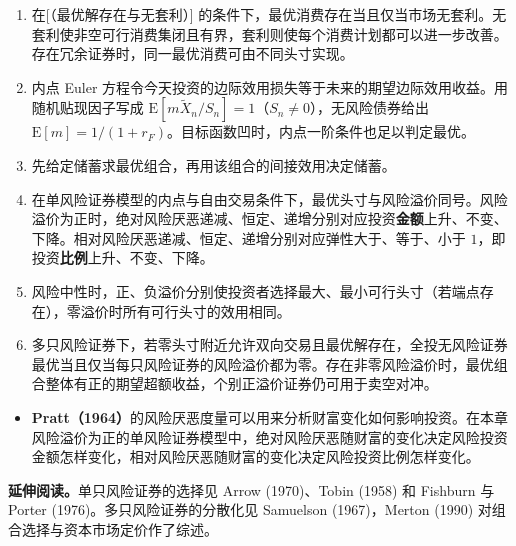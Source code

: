 \WJChapterSummary
\begin{tcolorbox}[summary]
\begin{enumerate}
 \item 在[（最优解存在与无套利）] 的条件下，最优消费存在当且仅当市场无套利。无套利使非空可行消费集闭且有界，套利则使每个消费计划都可以进一步改善。存在冗余证券时，同一最优消费可由不同头寸实现。
 \item 内点 Euler 方程令今天投资的边际效用损失等于未来的期望边际效用收益。用随机贴现因子写成 $\mathrm E[m\widetilde X_n/S_n]=1$（$S_n\ne0$），无风险债券给出 $\mathrm E[m]=1/(1+r_F)$。目标函数凹时，内点一阶条件也足以判定最优。
 \item 先给定储蓄求最优组合，再用该组合的间接效用决定储蓄。
 \item 在单风险证券模型的内点与自由交易条件下，最优头寸与风险溢价同号。风险溢价为正时，绝对风险厌恶递减、恒定、递增分别对应投资\textbf{金额}上升、不变、下降。相对风险厌恶递减、恒定、递增分别对应弹性大于、等于、小于 $1$，即投资\textbf{比例}上升、不变、下降。
 \item 风险中性时，正、负溢价分别使投资者选择最大、最小可行头寸（若端点存在），零溢价时所有可行头寸的效用相同。
 \item 多只风险证券下，若零头寸附近允许双向交易且最优解存在，全投无风险证券最优当且仅当每只风险证券的风险溢价都为零。存在非零风险溢价时，最优组合整体有正的期望超额收益，个别正溢价证券仍可用于卖空对冲。
\end{enumerate}
\end{tcolorbox}

\begin{tcolorbox}[knowledge,breakable=false,title={参考文献与本章贡献}]
\begin{itemize}
 \item \textbf{Pratt（1964）}的风险厌恶度量可以用来分析财富变化如何影响投资。在本章风险溢价为正的单风险证券模型中，绝对风险厌恶随财富的变化决定风险投资金额怎样变化，相对风险厌恶随财富的变化决定风险投资比例怎样变化。
\end{itemize}
\end{tcolorbox}

\textbf{延伸阅读。}单只风险证券的选择见 Arrow (1970)、Tobin (1958) 和 Fishburn 与 Porter (1976)。多只风险证券的分散化见 Samuelson (1967)，Merton (1990) 对组合选择与资本市场定价作了综述。

\fi

\WJChapterExercises

\endgroup

